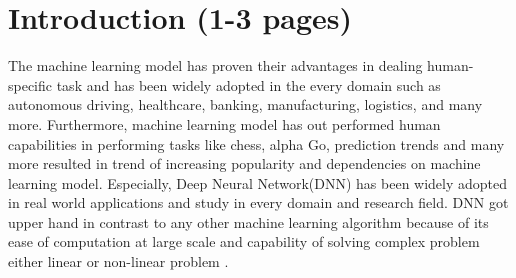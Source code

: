 \documentclass[%
	BCOR=8mm, %
	DIV=12, 
	toc=bibliography, %
	toc=listof, %
	oneside, %
	egregdoesnotlikesansseriftitles, %
	]{scrbook}
\begin{document}







\tableofcontents
\listoffigures
\listoftables

% 
\newpage


\pagestyle{headings}
\setcapindent{0pt}



\chapter{Introduction (1-3 pages)}
The machine learning model has proven their advantages in dealing human-specific task and has been widely adopted in the every domain such as autonomous driving, 
healthcare, banking, manufacturing, logistics, and many more. Furthermore, machine learning model has out performed human capabilities in performing tasks  like chess,
 alpha Go, prediction trends and many more resulted in trend of increasing popularity and dependencies on machine learning model. Especially, Deep Neural Network(DNN) 
 has been widely adopted in real world applications and study in every domain and research field. DNN got upper hand in contrast to any other machine learning algorithm 
 because of its ease of computation at large scale and capability of solving complex problem either linear or non-linear problem \cite{huq_adversarial_2020}. 
\end{document}
